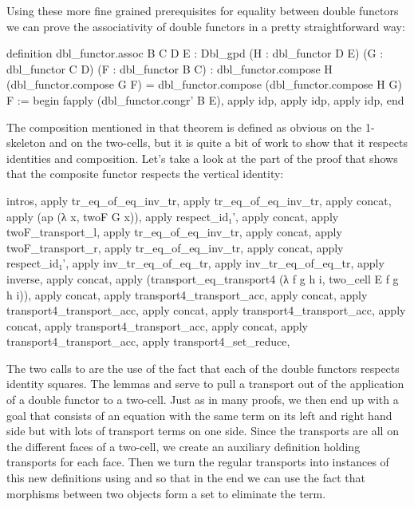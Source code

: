 Using these more fine grained prerequisites for equality between double functors
we can prove the associativity of double functors in a pretty straightforward way:
\begin{leancodebr}
  definition dbl_functor.assoc {B C D E : Dbl_gpd}
    (H : dbl_functor D E) (G : dbl_functor C D) (F : dbl_functor B C) :
    dbl_functor.compose H (dbl_functor.compose G F)
    = dbl_functor.compose (dbl_functor.compose H G) F :=
  begin
    fapply (dbl_functor.congr' B E),
        apply idp,
      apply idp,
    apply idp,
  end
\end{leancodebr}

The composition mentioned in that theorem is defined as obvious on the 1-skeleton
and on the two-cells, but it is quite a bit of work to show that it respects
identities and composition.
Let's take a look at the part of the proof that shows that the composite functor
respects the vertical identity:
\begin{leancodebr}
      intros, apply tr_eq_of_eq_inv_tr, apply tr_eq_of_eq_inv_tr,
      apply concat, apply (ap (λ x, twoF G x)), apply respect_id₁',
      apply concat, apply twoF_transport_l, apply tr_eq_of_eq_inv_tr,
      apply concat, apply twoF_transport_r, apply tr_eq_of_eq_inv_tr,
      apply concat, apply respect_id₁',
      apply inv_tr_eq_of_eq_tr, apply inv_tr_eq_of_eq_tr,
      apply inverse,
      apply concat, apply (transport_eq_transport4 (λ f g h i, two_cell E f g h i)),
      apply concat, apply transport4_transport_acc,
      apply concat, apply transport4_transport_acc,
      apply concat, apply transport4_transport_acc,
      apply concat, apply transport4_transport_acc,
      apply concat, apply transport4_transport_acc,
      apply transport4_set_reduce,
\end{leancodebr}
The two calls to  are the use of the fact that each of the
double functors respects identity squares.
The lemmas  and  serve to pull
a transport out of the application of a double functor to a two-cell.
Just as in many proofs, we then end up with a goal that consists of an equation
with the same term on its left and right hand side but with lots of transport
terms on one side.
Since the transports are all on the different faces of a two-cell, we create an
auxiliary definition  holding transports for each face.
Then we turn the regular transports into instances of this new definitions using
 and  so that in the
end we can use the fact that morphisms between two objects form a set to eliminate
the  term.

